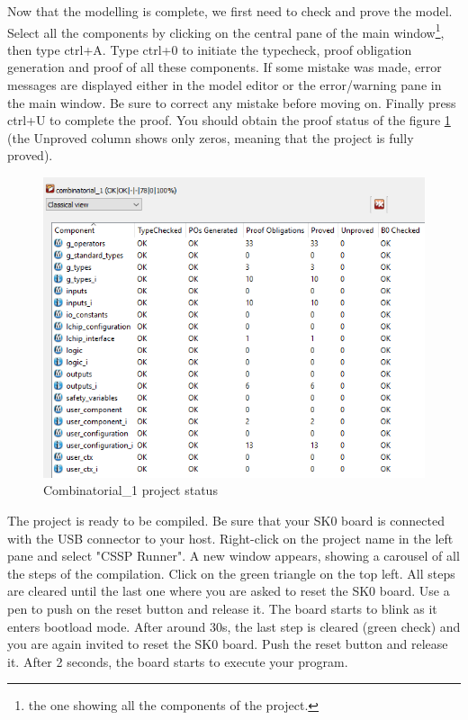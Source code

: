 Now that the modelling is complete, we first need to check and prove the model. Select all the components by clicking on the central pane of the main window\footnote{the one showing all the components of the project.}, then type ctrl+A. Type ctrl+0 to initiate the typecheck, proof obligation generation and proof of all these components. If some mistake was made, error messages are displayed either in the model editor or the error/warning pane in the main window. Be sure to correct any mistake before moving on. Finally press ctrl+U to complete the proof. You should obtain the proof status of the figure \ref{projects:Combinatorial_1-project-status} (the Unproved column shows only zeros, meaning that the project is fully proved).
\begin{figure}[h]
\centering\includegraphics[scale=0.5]{Pictures/chaptProjects/comb1-project-status.png}
\caption{Combinatorial\_1 project status}
\label{projects:Combinatorial_1-project-status}
\end{figure}
The project is ready to be compiled. Be sure that your SK0 board is connected with the USB connector to your host. Right-click on the project name in the left pane and select "CSSP Runner". A new window appears, showing a carousel of all the steps of the compilation. Click on the green triangle on the top left. All steps are cleared until the last one where you are asked to reset the SK0 board. Use a pen to push on the reset button and release it. The board starts to blink as it enters bootload mode. After around 30s, the last step is cleared (green check) and you are again invited to reset the SK0 board. Push the reset button and release it. After 2 seconds, the board starts to execute your program.

